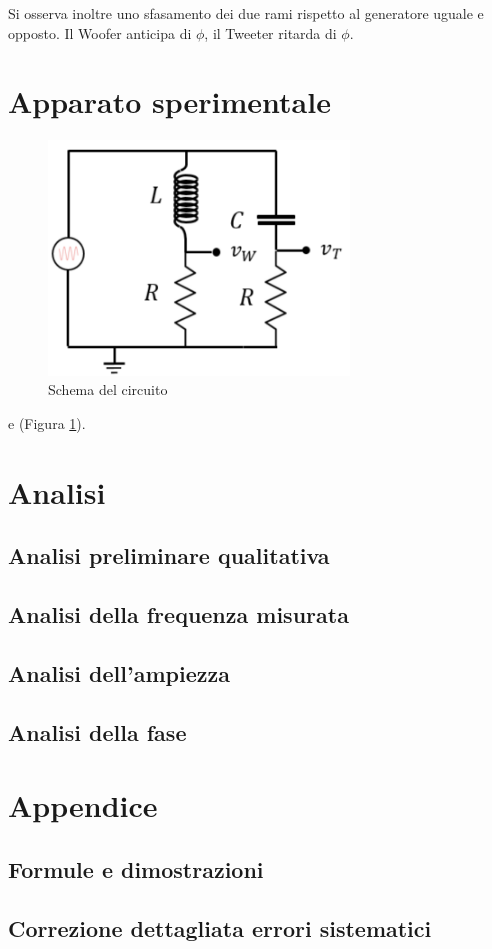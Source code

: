 \documentclass[12pt,a4paper]{article}
\begin{document}
Si osserva inoltre uno sfasamento dei due rami rispetto al generatore uguale e opposto. Il Woofer anticipa di $\phi$, il Tweeter ritarda di $\phi$.

\section{Apparato sperimentale}

\begin{figure}[H]
\centering
\includegraphics[width=8cm]{crossover_scheme.png}

\caption{Schema del circuito}
\label{Fig1}

\end{figure}

e (Figura \ref{Fig1}).



\section{Analisi}

\subsection{Analisi preliminare qualitativa}

\subsection{Analisi della frequenza misurata}

\subsection{Analisi dell'ampiezza}

\subsection{Analisi della fase}

\section{Appendice}

\subsection{Formule e dimostrazioni}

\subsection{Correzione dettagliata errori sistematici}
\end{document}
